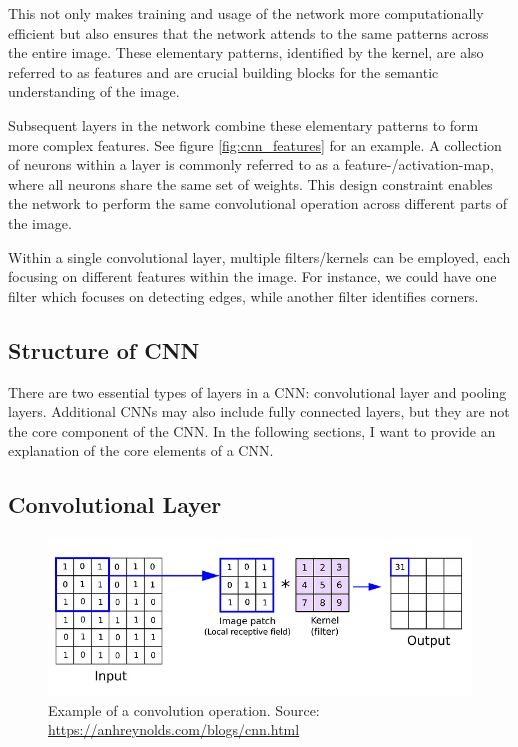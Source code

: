 This not only makes training and usage of the network more computationally efficient but also ensures that the network attends to the same patterns across the entire image.
These elementary patterns, identified by the kernel, are also referred to as features and are crucial building blocks for the semantic understanding of the image.

Subsequent layers in the network combine these elementary patterns to form more complex features.
See figure \ref{fig:cnn_features} for an example.
A collection of neurons within a layer is commonly referred to as a feature-/activation-map, where all neurons share the same set of weights. 
This design constraint enables the network to perform the same convolutional operation across different parts of the image.

Within a single convolutional layer, multiple filters/kernels can be employed, each focusing on different features within the image.
For instance, we could have one filter which focuses on detecting edges, while another filter identifies corners.

\subsection{Structure of CNN}

There are two essential types of layers in a CNN: convolutional layer and pooling layers.
Additional CNNs may also include fully connected layers, but they are not the core component of the CNN.
In the following sections, I want to provide an explanation of the core elements of a CNN.

\subsection{Convolutional Layer}

\begin{figure}[!h]
    \centering
    \includegraphics[width=1\textwidth]{figures/convolution_operation.png}
    \caption{Example of a convolution operation. 
    Source: \url{https://anhreynolds.com/blogs/cnn.html}}
    \label{fig:conv-op}
\end{figure}

